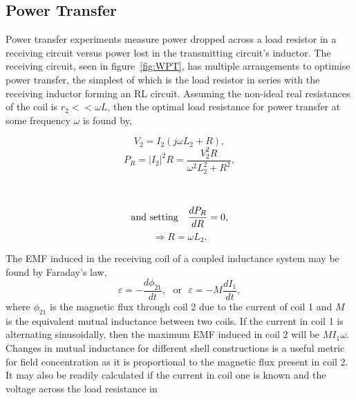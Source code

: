 \documentclass[11pt]{iopart}
\begin{document}
\subsection{Power Transfer}
Power transfer experiments measure power dropped across a load
resistor in a receiving circuit versus power lost in the transmitting
circuit's inductor. The receiving circuit, seen in
figure~\ref{fig:WPT}, has multiple arrangements to optimise power
transfer, the simplest of which is the load resistor in series with
the receiving inductor forming an RL circuit. Assuming the non-ideal
real resistances of the coil is $r_2 << \omega L$, then the optimal
load resistance for power transfer at some frequency $\omega$ is found
by,
\begin{center}
\begin{minipage}{0.4\linewidth}
\begin{equation}
  V_2 = I_2 (j\omega L_2 + R),  
\end{equation}
\begin{equation}
  P_R = |I_2|^2R = \frac{V_2^2R}{\omega^2L_2^2 + R^2},
  \label{eqn:RL-max-theory}
\end{equation}
\end{minipage}
~~
\vrule
\begin{minipage}{0.4\linewidth}
  $$\text{and setting\quad} \frac{dP_R}{dR} = 0,$$ 
\begin{equation}
  \Rightarrow R = \omega L_2.
  \label{eqn:RL-max}
\end{equation}
\end{minipage}
\end{center}
\vspace{0.2em}
The EMF induced in the receiving coil of a coupled inductance system
may be found by Faraday's law,
\vspace{-0.5em}
\begin{equation}
  \varepsilon = -\frac{d\phi_{21}}{dt},~~~\text{or}~~~\varepsilon = -M\frac{dI_{1}}{dt},
  \label{eqn:M}
\end{equation}
where $\phi_{21}$ is the magnetic flux through coil 2 due to the
current of coil 1 and $M$ is the equivalent mutual inductance between
two coils.
If the current in coil 1 is alternating sinusoidally, then the
maximum EMF induced in coil 2 will be $M I_1 \omega$. Changes in
mutual inductance for different shell constructions is a useful metric
for field concentration as it is proportional to the magnetic flux
present in coil 2. It may also be readily calculated if the current in
coil one is known and the voltage across the load resistance in
\end{document}
